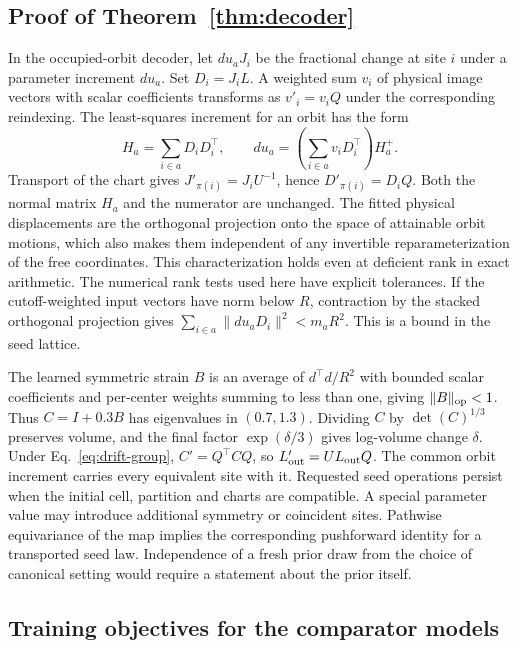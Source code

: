 \subsection{Proof of Theorem~\ref{thm:decoder}}\label{app:decoder-proof}
In the occupied-orbit decoder, let \(du_aJ_i\) be the fractional change at site \(i\) under a parameter increment \(du_a\). Set \(D_i=J_iL\). A weighted sum \(v_i\) of physical image vectors with scalar coefficients transforms as \(v'_i=v_iQ\) under the corresponding reindexing. The least-squares increment for an orbit has the form
\[
 H_a=\sum_{i\in a}D_iD_i^\top,\qquad
 du_a=\left(\sum_{i\in a} v_iD_i^\top\right)H_a^+ .
\]
Transport of the chart gives \(J'_{\pi(i)}=J_iU^{-1}\), hence \(D'_{\pi(i)}=D_iQ\). Both the normal matrix \(H_a\) and the numerator are unchanged. The fitted physical displacements are the orthogonal projection onto the space of attainable orbit motions, which also makes them independent of any invertible reparameterization of the free coordinates. This characterization holds even at deficient rank in exact arithmetic. The numerical rank tests used here have explicit tolerances. If the cutoff-weighted input vectors have norm below \(R\), contraction by the stacked orthogonal projection gives \(\sum_{i\in a}\|du_aD_i\|^2<m_aR^2\). This is a bound in the seed lattice.

The learned symmetric strain \(B\) is an average of \(d^\top d/R^2\) with bounded scalar coefficients and per-center weights summing to less than one, giving \(\|B\|_{\rm op}<1\). Thus \(C=I+0.3B\) has eigenvalues in \((0.7,1.3)\). Dividing \(C\) by \(\det(C)^{1/3}\) preserves volume, and the final factor \(\exp(\delta/3)\) gives log-volume change \(\delta\). Under Eq.~\eqref{eq:drift-group}, \(C'=Q^\top C Q\), so \(L'_{\rm out}=UL_{\rm out}Q\). The common orbit increment carries every equivalent site with it. Requested seed operations persist when the initial cell, partition and charts are compatible. A special parameter value may introduce additional symmetry or coincident sites. Pathwise equivariance of the map implies the corresponding pushforward identity for a transported seed law. Independence of a fresh prior draw from the choice of canonical setting would require a statement about the prior itself.

\subsection{Training objectives for the comparator models}
